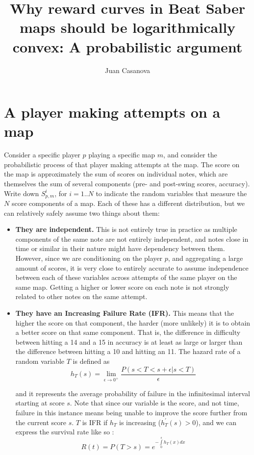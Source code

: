 \documentclass[12pt,a4paper]{article}
\title{Why reward curves in Beat Saber maps should be logarithmically convex: A probabilistic argument}
\author{Juan Casanova}
\begin{document}
\maketitle


\section{A player making attempts on a map}

Consider a specific player $p$ playing a specific map $m$, and consider the probabilistic process of that player making attempts at the map. The score on the map is approximately the sum of scores on individual notes, which are themselves the sum of several components (pre- and post-swing scores, accuracy). Write down $S_{p,m}^i$, for $i=1..N$ to indicate the random variables that measure the $N$ score components of a map. Each of these has a different distribution, but we can relatively safely assume two things about them:
\begin{itemize}
\item {\bf{They are independent.}}
This is not entirely true in practice as multiple components of the same note are not entirely independent, and notes close in time or similar in their nature might have dependency between them. However, since we are conditioning on the player $p$, and aggregating a large amount of scores, it is very close to entirely accurate to assume independence between each of these variables across attempts of the same player on the same map. Getting a higher or lower score on each note is not strongly related to other notes on the same attempt.
\item {\bf{They have an Increasing Failure Rate (IFR).}}
This means that the higher the score on that component, the harder (more unlikely) it is to obtain a better score on that same component. That is, the difference in difficulty between hitting a 14 and a 15 in accuracy is at least as large or larger than the difference between hitting a 10 and hitting an 11. The hazard rate of a random variable $T$ is defined as
\begin{equation}
h_T(s) = \lim\limits_{\epsilon \to 0^{+}} \frac{P(s < T < s +\epsilon | s < T)}{\epsilon}
\end{equation}

\noindent and it represents the average probability of failure in the infinitesimal interval starting at score $s$. Note that since our variable is the score, and not time, failure in this instance means being unable to improve the score further from the current score $s$. $T$ is IFR if $h_T$ is increasing ($h^{\prime}_T(s) > 0$), and we can express the survival rate like so \cite{2022_navarro_reliability_theory}:
\begin{equation}
R(t) = P(T > s) = e^{-\int\limits_0^s h_T(x) dx}
\end{equation}
\end{itemize}
\end{document}
